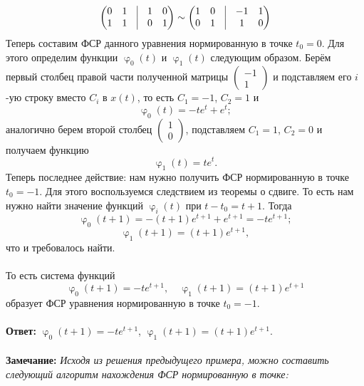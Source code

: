 \documentclass[a4paper, 12pt]{article}
\renewcommand{\varphi}{\upvarphi}
\begin{document}
$$\begin{pmatrix}
	0 & 1 & \vline & 1 & 0\\
	1 & 1 & \vline & 0 & 1
\end{pmatrix}\sim \begin{pmatrix}
	1 & 0 & \vline & -1 & 1\\
	0 & 1 & \vline & 1 & 0
\end{pmatrix}$$
Теперь составим ФСР данного уравнения нормированную в точке $t_0 = 0$. Для этого определим функции $\varphi_0(t)$ и $\varphi_1(t)$ следующим образом. Берём первый столбец правой части полученной матрицы $\begin{pmatrix}
	-1\\1
\end{pmatrix}$ и подставляем его $i$-ую строку вместо $C_i$ в $x(t)$, то есть $C_1 = -1$, $C_2 = 1$ и $$\varphi_0(t) = -te^t + e^t;$$
аналогично берем второй столбец $\begin{pmatrix}
	1\\0
\end{pmatrix}$, подставляем $C_1 = 1$, $C_2 = 0$ и получаем функцию
$$\varphi_1(t) = te^t.$$
Теперь последнее действие: нам нужно получить ФСР нормированную в точке $t_0 = -1$. Для этого воспользуемся следствием из теоремы о сдвиге. То есть нам нужно найти значение функций $\varphi_i(t)$ при $t - t_0 = t + 1$. Тогда $$\varphi_0(t+1) = -(t+1)e^{t+1} + e^{t+1} = -te^{t+1};$$
$$\varphi_1(t+1) = (t+1)e^{t+1},$$
что и требовалось найти.\\\\
То есть система функций $$\varphi_0(t+1)= -te^{t+1},\quad\varphi_1(t+1) = (t+1)e^{t+1}$$ образует ФСР уравнения нормированную в точке $t_0 = -1$.\\\\
\textbf{Ответ:} $\varphi_0(t+1)= -te^{t+1}$, $\varphi_1(t+1) = (t+1)e^{t+1}$.\\\\
\textbf{Замечание:} \textit{Исходя из решения предыдущего примера, можно составить следующий алгоритм нахождения ФСР нормированную в точке:}
\end{document}
